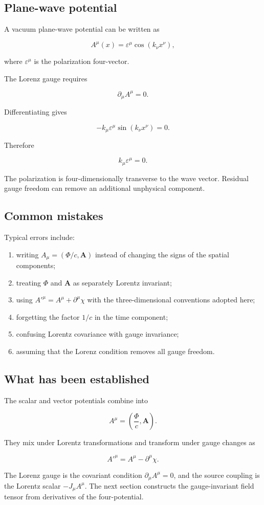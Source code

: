 \subsection{Plane-wave potential}

A vacuum plane-wave potential can be written as

\[
A^{\mu}(x)
=
\varepsilon^{\mu}
\cos(k_{\nu}x^{\nu}),
\]

where \(\varepsilon^{\mu}\) is the polarization four-vector.

The Lorenz gauge requires

\[
\partial_{\mu}A^{\mu}=0.
\]

Differentiating gives

\[
-k_{\mu}\varepsilon^{\mu}
\sin(k_{\nu}x^{\nu})=0.
\]

Therefore

\[
\boxed{
k_{\mu}\varepsilon^{\mu}=0
}.
\]

The polarization is four-dimensionally transverse to the wave vector. Residual gauge freedom can remove an additional unphysical component.

\subsection{Common mistakes}

Typical errors include:

\begin{enumerate}
    \item writing \(A_{\mu}=(\Phi/c,\mathbf{A})\) instead of changing the signs of the spatial components;
    \item treating \(\Phi\) and \(\mathbf{A}\) as separately Lorentz invariant;
    \item using \(A'^{\mu}=A^{\mu}+\partial^{\mu}\chi\) with the three-dimensional conventions adopted here;
    \item forgetting the factor \(1/c\) in the time component;
    \item confusing Lorentz covariance with gauge invariance;
    \item assuming that the Lorenz condition removes all gauge freedom.
\end{enumerate}

\subsection{What has been established}

The scalar and vector potentials combine into

\[
A^{\mu}
=
\left(
\frac{\Phi}{c},
\mathbf{A}
\right).
\]

They mix under Lorentz transformations and transform under gauge changes as

\[
A'^{\mu}
=
A^{\mu}-\partial^{\mu}\chi.
\]

The Lorenz gauge is the covariant condition \(\partial_{\mu}A^{\mu}=0\), and the source coupling is the Lorentz scalar \(-J_{\mu}A^{\mu}\). The next section constructs the gauge-invariant field tensor from derivatives of the four-potential.
